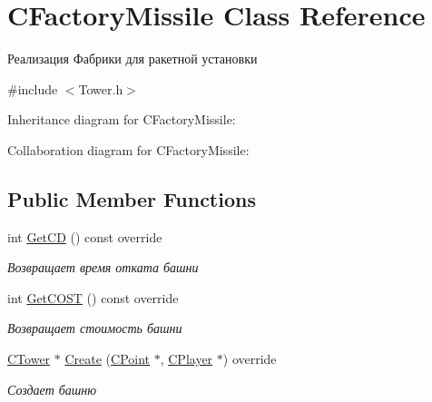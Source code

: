 \hypertarget{classCFactoryMissile}{}\section{C\+Factory\+Missile Class Reference}
\label{classCFactoryMissile}


Реализация Фабрики для ракетной установки  




{\ttfamily \#include $<$Tower.\+h$>$}



Inheritance diagram for C\+Factory\+Missile\+:


Collaboration diagram for C\+Factory\+Missile\+:
\subsection*{Public Member Functions}
\begin{DoxyCompactItemize}
\item 
int \hyperlink{classCFactoryMissile_abbfb53e2f4c81153ab00bdcdd9e3b3e1}{Get\+CD} () const override\hypertarget{classCFactoryMissile_abbfb53e2f4c81153ab00bdcdd9e3b3e1}{}\label{classCFactoryMissile_abbfb53e2f4c81153ab00bdcdd9e3b3e1}

\begin{DoxyCompactList}\small\item\em Возвращает время отката башни \end{DoxyCompactList}\item 
int \hyperlink{classCFactoryMissile_affd96e800c30226109277c1bc0c785e0}{Get\+C\+O\+ST} () const override\hypertarget{classCFactoryMissile_affd96e800c30226109277c1bc0c785e0}{}\label{classCFactoryMissile_affd96e800c30226109277c1bc0c785e0}

\begin{DoxyCompactList}\small\item\em Возвращает стоимость башни \end{DoxyCompactList}\item 
\hyperlink{classCTower}{C\+Tower} $\ast$ \hyperlink{classCFactoryMissile_ab4a1586c9f4a39f969d1fabab706bf96}{Create} (\hyperlink{classCPoint}{C\+Point} $\ast$, \hyperlink{classCPlayer}{C\+Player} $\ast$) override
\begin{DoxyCompactList}\small\item\em Создает башню \end{DoxyCompactList}\end{DoxyCompactItemize}


